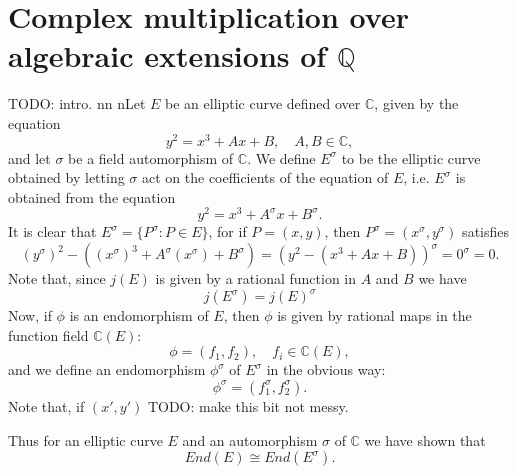 \newpage
\section{Complex multiplication over algebraic extensions of $\mathbb{Q}$}
\label{sec:compl-mult-over-Q}

TODO: intro.
nn
nLet $E$ be an elliptic curve defined over $\mathbb{C}$, given by the equation
\begin{equation*}
  y^{2} = x^{3} + Ax + B, \quad A, B \in \mathbb{C},
\end{equation*}
and let $\sigma$ be a field automorphism of $\mathbb{C}$. We define $E^{\sigma}$ to
be the elliptic curve obtained by letting $\sigma$ act on the coefficients of the
equation of $E$, i.e. $E^{\sigma}$ is obtained from the equation
\begin{equation*}
  y^{2} = x^{3} + A^{\sigma}x + B^{\sigma}.
\end{equation*}
It is clear that $E^{\sigma} = \{ P^{\sigma} : P \in E \}$, for if $P = (x,y)$, then
$P^{\sigma} = (x^{\sigma},y^{\sigma})$ satisfies
\begin{equation*}
  (y^{\sigma})^{2} - ( (x^{\sigma})^{3} + A^{\sigma}(x^{\sigma}) + B^{\sigma} ) = (y^{2} -
  (x^{3} + Ax + B))^{\sigma} = 0^{\sigma} = 0.
\end{equation*}
Note that, since $j(E)$ is given by a rational function in $A$ and $B$ we have
\begin{equation}
  \label{eq:j(E-sigma)-equals-j(E)-sigma}
  j(E^{\sigma}) = j(E)^{\sigma}
\end{equation}
Now, if $\phi$ is an endomorphism of $E$, then $\phi$ is given by rational maps in
the function field $\mathbb{C}(E)$:
\begin{equation*}
  \phi = (f_{1},f_{2}), \quad f_{i} \in \mathbb{C}(E),
\end{equation*}
and we define an endomorphism $\phi^{\sigma}$ of $E^{\sigma}$ in the obvious way:
\begin{equation*}
  \phi^{\sigma} = (f_{1}^{\sigma},f_{2}^{\sigma}).
\end{equation*}
Note that, if $(x\prime{},y\prime{})$ TODO: make this bit not messy.

Thus for an elliptic curve $E$ and an automorphism $\sigma$ of $\mathbb{C}$ we have
shown that
\begin{equation}
  \label{eq:End(E)-equals-End(E-sigma)}
  End(E) \cong End(E^{\sigma}).
\end{equation}

